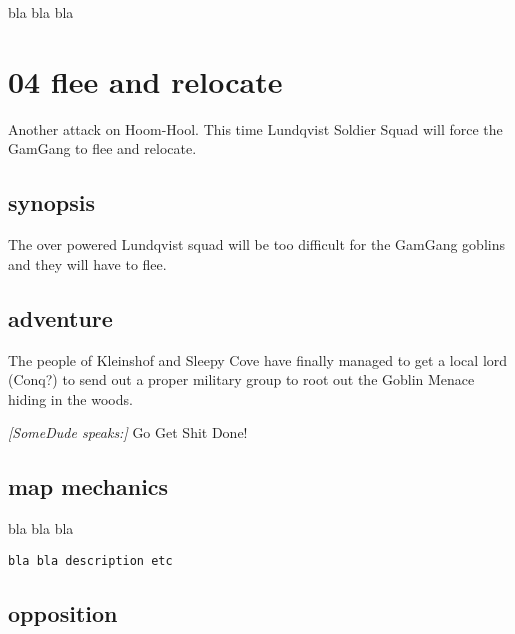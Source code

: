 bla bla bla









\newpage
\section*{04 flee and relocate}


Another attack on Hoom-Hool. This time Lundqvist Soldier Squad will force the GamGang to flee and relocate.


\subsection*{synopsis}

The over powered Lundqvist squad will be too difficult for the GamGang goblins and they will have to flee.


\subsection*{adventure}

The people of Kleinshof and Sleepy Cove have finally managed to get a local lord (Conq?) to send out a proper military group to root out the Goblin Menace hiding in the woods.

\begin{readoutloud}
\emph{[SomeDude speaks:]}
Go Get Shit Done!
\end{readoutloud}


\subsection*{map mechanics}

bla bla bla

\small \begin{verbatim}
bla bla description etc
\end{verbatim} \normalsize


\subsection*{opposition}

